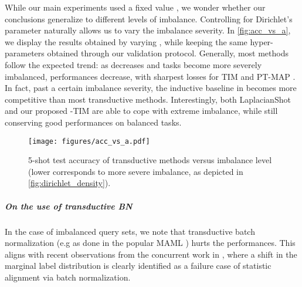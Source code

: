            While our main experiments used a fixed value , we wonder whether our conclusions generalize to different levels of imbalance. Controlling for Dirichlet's parameter  naturally allows us to vary the imbalance severity. In \autoref{fig:acc_vs_a}, we display the results obtained by varying , while keeping the same hyper-parameters obtained through our validation protocol. Generally, most methods follow the expected trend: as  decreases and tasks become more severely imbalanced, performances decrease, with sharpest losses for TIM \cite{malik2020Tim} and PT-MAP \cite{pt_map}. In fact, past a certain imbalance severity, the inductive baseline in  \cite{wang2019simpleshot} becomes more competitive than most transductive methods. Interestingly, both LaplacianShot \cite{Laplacian} and our proposed -TIM are able to cope with extreme imbalance, while still conserving good performances on balanced tasks.
         \begin{figure}[h]
                \centering
                \texttt{[image: figures/acc\_vs\_a.pdf]} \\
                \caption{5-shot test accuracy of transductive methods versus imbalance level (lower  corresponds to more severe imbalance, as depicted in \autoref{fig:dirichlet_density}). }
                \label{fig:acc_vs_a}
            \end{figure}
        \subparagraph{On the use of transductive BN} In the case of imbalanced query sets, we note that transductive batch normalization (e.g as done in the popular MAML \cite{finn2018probabilistic}) hurts the performances. This aligns with recent observations from the concurrent work in \cite{post_hoc}, where a shift in the marginal label distribution is clearly identified as a failure case of statistic alignment via  batch normalization. 
        
%

